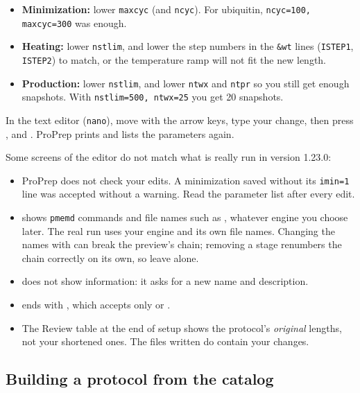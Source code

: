 \begin{itemize}
  \item \textbf{Minimization:} lower \texttt{maxcyc} (and \texttt{ncyc}).
        For ubiquitin, \texttt{ncyc=100, maxcyc=300} was enough.
  \item \textbf{Heating:} lower \texttt{nstlim}, and lower the step numbers
        in the \texttt{\&wt} lines (\texttt{ISTEP1}, \texttt{ISTEP2}) to match,
        or the temperature ramp will not fit the new length.
  \item \textbf{Production:} lower \texttt{nstlim}, and lower \texttt{ntwx}
        and \texttt{ntpr} so you still get enough snapshots. With
        \texttt{nstlim=500, ntwx=25} you get 20 snapshots.
\end{itemize}

In the text editor (\texttt{nano}), move with the arrow keys, type your
change, then press ,  and . ProPrep prints
 and lists the parameters again.

\begin{watchout}
Some screens of the editor do not match what is really run in version
1.23.0:
\begin{itemize}
  \item ProPrep does not check your edits. A minimization saved without its
        \texttt{imin=1} line was accepted without a warning. Read the
        parameter list after every edit.
  \item {} shows \texttt{pmemd} commands and file names such as
        , whatever engine you choose later. The real run uses
        your engine and its own file names. Changing the names with
         can break the preview's chain; removing a stage renumbers
        the chain correctly on its own, so leave  alone.
  \item {} does not show information: it asks for a new name and
        description.
  \item {} ends with , which accepts only  or .
  \item The Review table at the end of setup shows the protocol's
        \emph{original} lengths, not your shortened ones. The files written
        do contain your changes.
\end{itemize}
\end{watchout}

\subsection{Building a protocol from the catalog}

